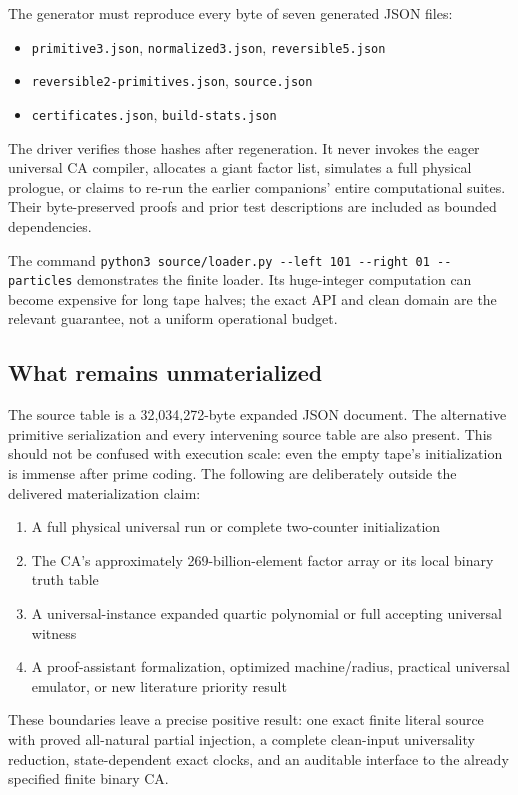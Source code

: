 \documentclass[11pt,a4paper]{article}
\numberwithin{equation}{section}
\newcommand{\code}[1]{\texttt{\small #1}}
\begin{document}
The generator must reproduce every byte of seven generated JSON files:
\begin{itemize}
\item \code{primitive3.json}, \code{normalized3.json}, \code{reversible5.json}
\item \code{reversible2-primitives.json}, \code{source.json}
\item \code{certificates.json}, \code{build-stats.json}
\end{itemize}
The driver verifies
those hashes after regeneration. It never invokes the eager universal CA
compiler, allocates a giant factor list, simulates a full physical prologue,
or claims to re-run the earlier companions' entire computational suites.
Their byte-preserved proofs and prior test descriptions are included as
bounded dependencies.

The command \code{python3 source/loader.py -{}-left 101 -{}-right 01
-{}-particles} demonstrates the finite loader. Its huge-integer computation
can become expensive for long tape halves; the exact API and clean domain
are the relevant guarantee, not a uniform operational budget.

\subsection{What remains unmaterialized}
The source table is a 32,034,272-byte expanded JSON document. The alternative
primitive serialization and every intervening source table are also present.
This should not be confused with execution scale: even the empty tape's
initialization is immense after prime coding. The following are deliberately
outside the delivered materialization claim:
\begin{enumerate}
\item A full physical universal run or complete two-counter initialization
\item The CA's approximately 269-billion-element factor array or its local
binary truth table
\item A universal-instance expanded quartic polynomial or full accepting
universal witness
\item A proof-assistant formalization, optimized machine/radius, practical
universal emulator, or new literature priority result
\end{enumerate}
These boundaries leave a precise positive result: one exact finite literal
source with proved all-natural partial injection, a complete clean-input
universality reduction, state-dependent exact clocks, and an auditable
interface to the already specified finite binary CA.
\end{document}

